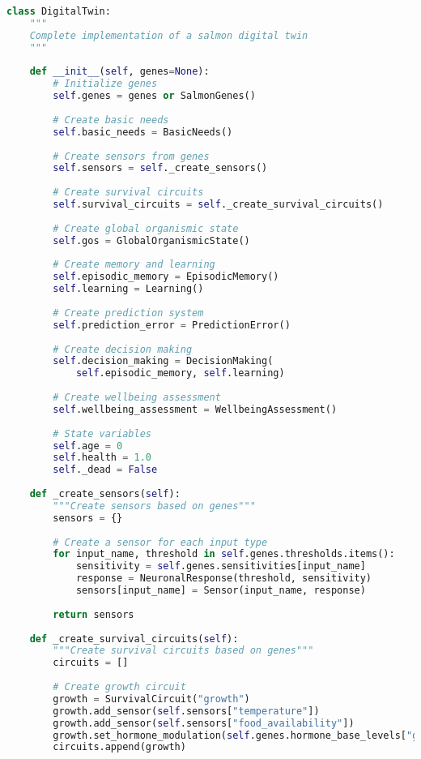 \documentclass[11pt,a4paper]{article}
\begin{document}
\begin{lstlisting}[language=Python]
class DigitalTwin:
    """
    Complete implementation of a salmon digital twin
    """
    
    def __init__(self, genes=None):
        # Initialize genes
        self.genes = genes or SalmonGenes()
        
        # Create basic needs
        self.basic_needs = BasicNeeds()
        
        # Create sensors from genes
        self.sensors = self._create_sensors()
        
        # Create survival circuits
        self.survival_circuits = self._create_survival_circuits()
        
        # Create global organismic state
        self.gos = GlobalOrganismicState()
        
        # Create memory and learning
        self.episodic_memory = EpisodicMemory()
        self.learning = Learning()
        
        # Create prediction system
        self.prediction_error = PredictionError()
        
        # Create decision making
        self.decision_making = DecisionMaking(
            self.episodic_memory, self.learning)
        
        # Create wellbeing assessment
        self.wellbeing_assessment = WellbeingAssessment()
        
        # State variables
        self.age = 0
        self.health = 1.0
        self._dead = False
        
    def _create_sensors(self):
        """Create sensors based on genes"""
        sensors = {}
        
        # Create a sensor for each input type
        for input_name, threshold in self.genes.thresholds.items():
            sensitivity = self.genes.sensitivities[input_name]
            response = NeuronalResponse(threshold, sensitivity)
            sensors[input_name] = Sensor(input_name, response)
            
        return sensors
        
    def _create_survival_circuits(self):
        """Create survival circuits based on genes"""
        circuits = []
        
        # Create growth circuit
        growth = SurvivalCircuit("growth")
        growth.add_sensor(self.sensors["temperature"])
        growth.add_sensor(self.sensors["food_availability"])
        growth.set_hormone_modulation(self.genes.hormone_base_levels["growth"])
        circuits.append(growth)
        

\end{lstlisting}
\end{document}
